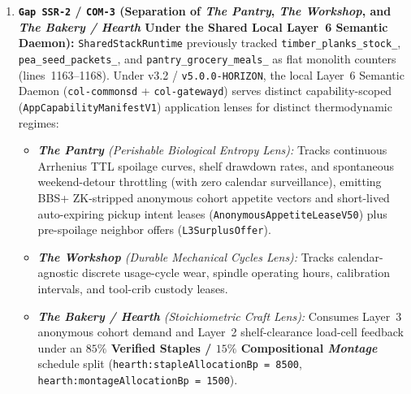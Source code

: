 \begin{enumerate}
  \item \textbf{\texttt{Gap SSR-2} / \texttt{COM-3} (Separation of \emph{The Pantry}, \emph{The Workshop}, and \emph{The Bakery / Hearth} Under the Shared Local Layer~6 Semantic Daemon):}
  \texttt{SharedStackRuntime} previously tracked \texttt{timber\_planks\_stock\_}, \texttt{pea\_seed\_packets\_}, and \texttt{pantry\_grocery\_meals\_} as flat monolith counters (lines~1163--1168). Under v3.2 / \texttt{v5.0.0-HORIZON}, the local Layer~6 Semantic Daemon (\texttt{col-commonsd} + \texttt{col-gatewayd}) serves distinct capability-scoped (\texttt{AppCapabilityManifestV1}) application lenses for distinct thermodynamic regimes:
  \begin{itemize}
    \item \emph{\textbf{The Pantry} (Perishable Biological Entropy Lens):} Tracks continuous Arrhenius TTL spoilage curves, shelf drawdown rates, and spontaneous weekend-detour throttling (with zero calendar surveillance), emitting BBS+ ZK-stripped anonymous cohort appetite vectors and short-lived auto-expiring pickup intent leases (\texttt{AnonymousAppetiteLeaseV50}) plus pre-spoilage neighbor offers (\texttt{L3SurplusOffer}).
    \item \emph{\textbf{The Workshop} (Durable Mechanical Cycles Lens):} Tracks calendar-agnostic discrete usage-cycle wear, spindle operating hours, calibration intervals, and tool-crib custody leases.
    \item \emph{\textbf{The Bakery / Hearth} (Stoichiometric Craft Lens):} Consumes Layer~3 anonymous cohort demand and Layer~2 shelf-clearance load-cell feedback under an \textbf{$85\%$ Verified Staples / $15\%$ Compositional \emph{Montage}} schedule split (\texttt{hearth:stapleAllocationBp = 8500}, \texttt{hearth:montageAllocationBp = 1500}).
  \end{itemize}


\end{enumerate}
